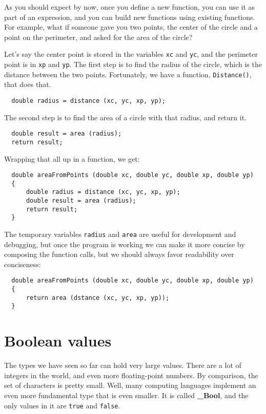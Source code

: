 As you should expect by now, once you define a new function,
you can use it as part of an expression, and you can build
new functions using existing functions.  For example, what if someone
gave you two points, the center of the circle and a point on
the perimeter, and asked for the area of the circle?

Let's say the center point is stored in the variables {\tt xc}
and {\tt yc}, and the perimeter point is in {\tt xp} and
{\tt yp}.  The first step is to find the radius of the circle, which
is the distance between the two points.  Fortunately, we have
a function, {\tt Distance()}, that does that.

\begin{verbatim}
  double radius = distance (xc, yc, xp, yp);
\end{verbatim}
%
The second step is to find the area of a circle with that
radius, and return it.

\begin{verbatim}
  double result = area (radius);
  return result;
\end{verbatim}
%
Wrapping that all up in a function, we get:

\begin{verbatim}
  double areaFromPoints (double xc, double yc, double xp, double yp) 
  {
      double radius = distance (xc, yc, xp, yp);
      double result = area (radius);
      return result;
  } 
\end{verbatim}
%


The temporary variables {\tt radius} and {\tt area} are
useful for development and debugging, but once the program is
working we can make it more concise by composing
the function calls, but we should always favor readability over conciseness:

\begin{verbatim}
  double areaFromPoints (double xc, double yc, double xp, double yp) 
  {
      return area (dstance (xc, yc, xp, yp));
  } 
\end{verbatim}


\section{Boolean values}

The types we have seen so far can hold very large values.  There are a lot
of integers in the world, and even more floating-point numbers.
By comparison, the set of characters is pretty small.  Well, many computing
languages implement an even more fundamental type that is even smaller.  It is called
{\bf \_Bool}, and the only values in it are {\tt true} and {\tt false}.

